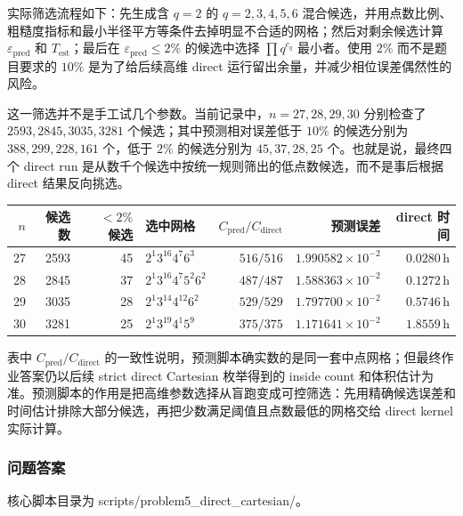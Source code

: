 \documentclass[12pt,a4paper,fontset=none]{ctexart}
\begin{document}
实际筛选流程如下：先生成含 \(q=2\) 的 \(q=2,3,4,5,6\) 混合候选，并用点数比例、粗糙度指标和最小半径平方等条件去掉明显不合适的网格；然后对剩余候选计算
\(\varepsilon_{\mathrm{pred}}\) 和 \(T_{\mathrm{est}}\)；最后在
\(\varepsilon_{\mathrm{pred}}\le2\%\) 的候选中选择
\(\prod q^{c_q}\) 最小者。使用 \(2\%\) 而不是题目要求的 \(10\%\) 是为了给后续高维 direct 运行留出余量，并减少相位误差偶然性的风险。

这一筛选并不是手工试几个参数。当前记录中，\(n=27,28,29,30\) 分别检查了
\(2593,2845,3035,3281\) 个候选；其中预测相对误差低于 \(10\%\) 的候选分别为
\(388,299,228,161\) 个，低于 \(2\%\) 的候选分别为
\(45,37,28,25\) 个。也就是说，最终四个 direct run 是从数千个候选中按统一规则筛出的低点数候选，而不是事后根据 direct 结果反向挑选。

\begin{table}[H]
  \centering
  \small
  \setlength{\tabcolsep}{3pt}
  \begin{tabular}{r r r l r r r}
    \toprule
    \(n\) & 候选数 & \(<2\%\) 候选 & 选中网格 & \(C_{\mathrm{pred}}/C_{\mathrm{direct}}\) & 预测误差 & direct 时间 \\
    \midrule
    27 & 2593 & 45 & \(2^1 3^{16}4^7 6^3\) & \(516/516\) & \(1.990582\times10^{-2}\) & \(0.0280\,\mathrm{h}\) \\
    28 & 2845 & 37 & \(2^1 3^{16}4^7 5^2 6^2\) & \(487/487\) & \(1.588363\times10^{-2}\) & \(0.1272\,\mathrm{h}\) \\
    29 & 3035 & 28 & \(2^1 3^{14}4^{12}6^2\) & \(529/529\) & \(1.797700\times10^{-2}\) & \(0.5746\,\mathrm{h}\) \\
    30 & 3281 & 25 & \(2^1 3^{19}4^1 5^9\) & \(375/375\) & \(1.171641\times10^{-2}\) & \(1.8559\,\mathrm{h}\) \\
    \bottomrule
  \end{tabular}
\end{table}

表中 \(C_{\mathrm{pred}}/C_{\mathrm{direct}}\) 的一致性说明，预测脚本确实数的是同一套中点网格；但最终作业答案仍以后续 strict direct Cartesian 枚举得到的 inside count 和体积估计为准。预测脚本的作用是把高维参数选择从盲跑变成可控筛选：先用精确候选误差和时间估计排除大部分候选，再把少数满足阈值且点数最低的网格交给 direct kernel 实际计算。

\subsubsection{问题答案}\label{ux95eeux9898ux7b54ux6848-10}

\noindent\begin{minipage}{\linewidth}
\raggedright
核心脚本目录为 \textnormal{scripts/problem5\_direct\_cartesian/}。
\end{minipage}
\end{document}
